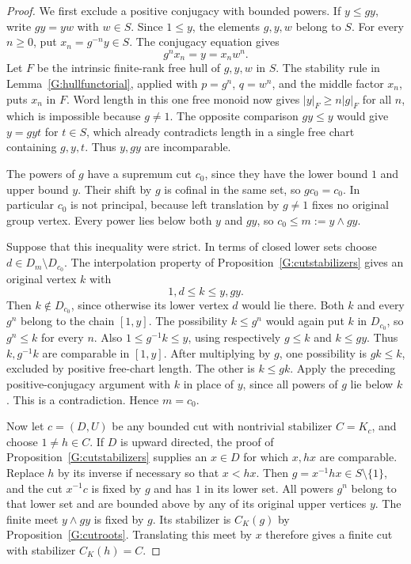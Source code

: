 \begin{proof}
We first exclude a positive conjugacy with bounded powers.
If $y\le gy$, write $gy=yw$ with $w\in S$. Since $1\le y$,
the elements $g,y,w$ belong to $S$. For every $n\ge0$, put
$x_n=g^{-n}y\in S$. The conjugacy equation gives
\[
 g^n x_n=y=x_n w^n.
\]
Let $F$ be the intrinsic finite-rank free hull of $g,y,w$ in
$S$. The stability rule in Lemma~\ref{G:hullfunctorial}, applied
with $p=g^n$, $q=w^n$, and the middle factor $x_n$, puts $x_n$
in $F$. Word length in this one free monoid now gives
$|y|_F\ge n|g|_F$ for all $n$, which is impossible because
$g\ne1$. The opposite comparison $gy\le y$ would give
$y=gyt$ for $t\in S$, which already contradicts length in a
single free chart containing $g,y,t$. Thus $y,gy$ are
incomparable.

The powers of $g$ have a supremum cut $c_0$, since they have
the lower bound $1$ and upper bound $y$. Their shift by $g$
is cofinal in the same set, so $gc_0=c_0$. In particular
$c_0$ is not principal, because left translation by $g\ne1$
fixes no original group vertex. Every power lies below both
$y$ and $gy$, so $c_0\le m:=y\wedge gy$.

Suppose that this inequality were strict. In terms of closed
lower sets choose $d\in D_m\setminus D_{c_0}$. The
interpolation property of Proposition~\ref{G:cutstabilizers}
gives an original vertex $k$ with
\[
 1,d\le k\le y,gy.
\]
Then $k\notin D_{c_0}$, since otherwise its lower vertex $d$
would lie there. Both $k$ and every $g^n$ belong to the chain
$[1,y]$. The possibility $k\le g^n$ would again put $k$ in
$D_{c_0}$, so $g^n\le k$ for every $n$. Also
$1\le g^{-1}k\le y$, using respectively $g\le k$ and
$k\le gy$. Thus $k,g^{-1}k$ are comparable in $[1,y]$.
After multiplying by $g$, one possibility is $gk\le k$,
excluded by positive free-chart length. The other is
$k\le gk$. Apply the preceding positive-conjugacy argument
with $k$ in place of $y$, since all powers of $g$ lie below
$k$. This is a contradiction. Hence $m=c_0$.

Now let $c=(D,U)$ be any bounded cut with nontrivial stabilizer
$C=K_c$, and choose $1\ne h\in C$. If $D$ is upward directed,
the proof of Proposition~\ref{G:cutstabilizers} supplies an
$x\in D$ for which $x,hx$ are comparable. Replace $h$ by its
inverse if necessary so that $x<hx$. Then
$g=x^{-1}hx\in S\setminus\{1\}$, and the cut $x^{-1}c$
is fixed by $g$ and has $1$ in its lower set. All powers
$g^n$ belong to that lower set and are bounded above by any
of its original upper vertices $y$. The finite meet $y\wedge
gy$ is fixed by $g$. Its stabilizer is $C_K(g)$ by
Proposition~\ref{G:cutroots}. Translating this meet by $x$
therefore gives a finite cut with stabilizer
$C_K(h)=C$.


\end{proof}
